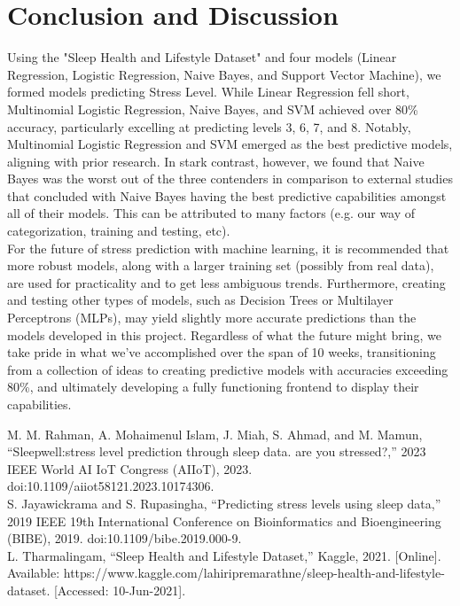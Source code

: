 \documentclass[11pt, letterpaper]{article}
\begin{document}
    \section*{Conclusion and Discussion}
    \noindent Using the "Sleep Health and Lifestyle Dataset" and four models (Linear Regression, Logistic Regression, Naive Bayes, and Support Vector Machine), we formed models predicting Stress Level. While Linear Regression fell short, Multinomial Logistic Regression, Naive Bayes, and SVM achieved over 80\% accuracy, particularly excelling at predicting levels 3, 6, 7, and 8. Notably, Multinomial Logistic Regression and SVM emerged as the best predictive models, aligning with prior research. In stark contrast, however, we found that Naive Bayes was the worst out of the three contenders in comparison to external studies that concluded with Naive Bayes having the best predictive capabilities amongst all of their models. This can be attributed to many factors (e.g. our way of categorization, training and testing, etc).\\
    
    \noindent For the future of stress prediction with machine learning, it is recommended that more robust models, along with a larger training set (possibly from real data), are used for practicality and to get less ambiguous trends. Furthermore, creating and testing other types of models, such as Decision Trees or Multilayer Perceptrons (MLPs), may yield slightly more accurate predictions than the models developed in this project. Regardless of what the future might bring, we take pride in what we’ve accomplished over the span of 10 weeks, transitioning from a collection of ideas to creating predictive models with accuracies exceeding 80\%, and ultimately developing a fully functioning frontend to display their capabilities.

    \begin{thebibliography}{9}
         M. M. Rahman, A. Mohaimenul Islam, J. Miah, S. Ahmad, and M. Mamun, “Sleepwell:stress level prediction through sleep data. are you stressed?,” 2023 IEEE World AI IoT Congress (AIIoT), 2023. doi:10.1109/aiiot58121.2023.10174306.\\

         S. Jayawickrama and S. Rupasingha, “Predicting stress levels using sleep data,” 2019 IEEE 19th International Conference on Bioinformatics and Bioengineering (BIBE), 2019. doi:10.1109/bibe.2019.000-9.\\

         L. Tharmalingam, “Sleep Health and Lifestyle Dataset,” Kaggle, 2021. [Online]. Available: https://www.kaggle.com/lahiripremarathne/sleep-health-and-lifestyle-dataset. [Accessed: 10-Jun-2021].\\

    \end{thebibliography}
\end{document}
